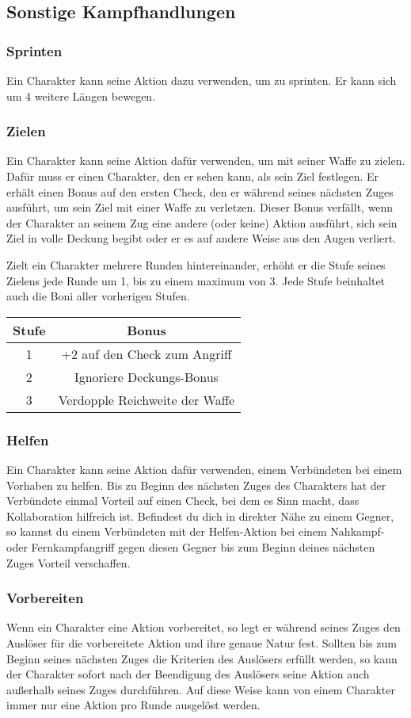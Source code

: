 \subsection{Sonstige Kampfhandlungen}
\subsubsection{Sprinten}
Ein Charakter kann seine Aktion dazu verwenden, um zu sprinten. Er kann sich um 4 weitere Längen bewegen.
\subsubsection{Zielen}
Ein Charakter kann seine Aktion dafür verwenden, um mit seiner Waffe zu zielen. Dafür muss er einen Charakter, den er sehen kann, als sein Ziel festlegen. Er erhält einen Bonus auf den ersten Check, den er während seines nächsten Zuges ausführt, um sein Ziel mit einer Waffe zu verletzen. Dieser Bonus verfällt, wenn der Charakter an seinem Zug eine andere (oder keine) Aktion ausführt, sich sein Ziel in volle Deckung begibt oder er es auf andere Weise aus den Augen verliert.

Zielt ein Charakter mehrere Runden hintereinander, erhöht er die Stufe seines Zielens jede Runde um 1, bis zu einem maximum von 3. Jede Stufe beinhaltet auch die Boni aller vorherigen Stufen.
\begin{tabular}{c|c}
Stufe & Bonus\\		
\hline
1 & +2 auf den Check zum Angriff \\
2 & Ignoriere Deckungs-Bonus \\
3 & Verdopple Reichweite der Waffe \\
\end{tabular}
\subsubsection{Helfen}
Ein Charakter kann seine Aktion dafür verwenden, einem Verbündeten bei einem Vorhaben zu helfen. Bis zu Beginn des nächsten Zuges des Charakters hat der Verbündete einmal Vorteil auf einen Check, bei dem es Sinn macht, dass Kollaboration hilfreich ist. Befindest du dich in direkter Nähe zu einem Gegner, so kannst du einem Verbündeten mit der Helfen-Aktion bei einem Nahkampf- oder Fernkampfangriff gegen diesen Gegner bis zum Beginn deines nächsten Zuges Vorteil verschaffen.
\subsubsection{Vorbereiten}
Wenn ein Charakter eine Aktion vorbereitet, so legt er während seines Zuges den Auslöser für die vorbereitete Aktion und ihre genaue Natur fest. Sollten bis zum Beginn seines nächsten Zuges die Kriterien des Auslösers erfüllt werden, so kann der Charakter sofort nach der Beendigung des Auslösers seine Aktion auch außerhalb seines Zuges durchführen. Auf diese Weise kann von einem Charakter immer nur eine Aktion pro Runde ausgelöst werden.
